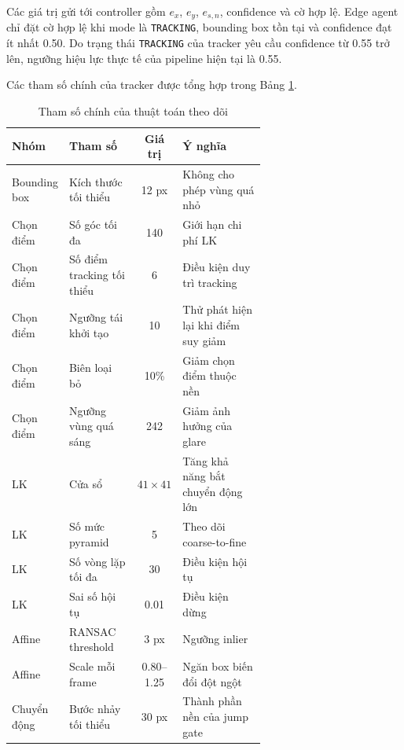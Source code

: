 \documentclass[../DoAn.tex]{subfiles}
\begin{document}
Các giá trị gửi tới controller gồm $e_x$, $e_y$, $e_{s,n}$, confidence và cờ hợp lệ. Edge agent chỉ đặt cờ hợp lệ khi mode là \texttt{TRACKING}, bounding box tồn tại và confidence đạt ít nhất 0.50. Do trạng thái \texttt{TRACKING} của tracker yêu cầu confidence từ 0.55 trở lên, ngưỡng hiệu lực thực tế của pipeline hiện tại là 0.55.

Các tham số chính của tracker được tổng hợp trong Bảng \ref{tab:thamso_tracker}.

\begin{table}[htbp]
    \centering
    \caption{Tham số chính của thuật toán theo dõi}
    \label{tab:thamso_tracker}
    \renewcommand{\arraystretch}{1.2}
    \begin{tabular}{|l|p{0.28\linewidth}|c|p{0.36\linewidth}|}
        \hline
        \textbf{Nhóm} & \textbf{Tham số} & \textbf{Giá trị} & \textbf{Ý nghĩa} \\
        \hline
        Bounding box & Kích thước tối thiểu & 12 px & Không cho phép vùng quá nhỏ \\
        \hline
        Chọn điểm & Số góc tối đa & 140 & Giới hạn chi phí LK \\
        \hline
        Chọn điểm & Số điểm tracking tối thiểu & 6 & Điều kiện duy trì tracking \\
        \hline
        Chọn điểm & Ngưỡng tái khởi tạo & 10 & Thử phát hiện lại khi điểm suy giảm \\
        \hline
        Chọn điểm & Biên loại bỏ & 10\% & Giảm chọn điểm thuộc nền \\
        \hline
        Chọn điểm & Ngưỡng vùng quá sáng & 242 & Giảm ảnh hưởng của glare \\
        \hline
        LK & Cửa sổ & $41 \times 41$ & Tăng khả năng bắt chuyển động lớn \\
        \hline
        LK & Số mức pyramid & 5 & Theo dõi coarse-to-fine \\
        \hline
        LK & Số vòng lặp tối đa & 30 & Điều kiện hội tụ \\
        \hline
        LK & Sai số hội tụ & 0.01 & Điều kiện dừng \\
        \hline
        Affine & RANSAC threshold & 3 px & Ngưỡng inlier \\
        \hline
        Affine & Scale mỗi frame & 0.80--1.25 & Ngăn box biến đổi đột ngột \\
        \hline
        Chuyển động & Bước nhảy tối thiểu & 30 px & Thành phần nền của jump gate \\
        \hline

\end{tabular}
\end{table}
\end{document}
